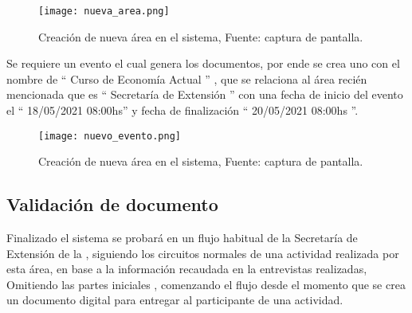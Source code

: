 \begin{figure}[H]
  \centering
  {\texttt{[image: nueva\_area.png]}}
  \caption{Creación de nueva área en el sistema,  Fuente: captura de pantalla. }
  \label{img:nuva_area}
\end{figure}
Se requiere un evento el cual genera los documentos, por ende se crea uno con el nombre de “ Curso de Economía Actual ” , que se relaciona al área recién mencionada que es 
“ Secretaría de Extensión ” con una fecha de inicio del evento el “ 18/05/2021 08:00hs” y fecha de finalización “ 20/05/2021 08:00hs ”.
\begin{figure}[H]
  \centering
  {\texttt{[image: nuevo\_evento.png]}}
  \caption{Creación de nueva área en el sistema,  Fuente: captura de pantalla. }
  \label{img:nuevo_evento}
\end{figure}




\subsection{Validación de documento}

Finalizado el sistema se probará en un flujo habitual de la Secretaría de Extensión de la , 
siguiendo los circuitos normales de una actividad realizada por esta área, en base a la información recaudada en la entrevistas realizadas\cite[]{larraburu_secretariextension_2020},
Omitiendo las partes iniciales , comenzando el flujo desde el momento que se crea un documento digital para entregar 
al participante de una actividad.

